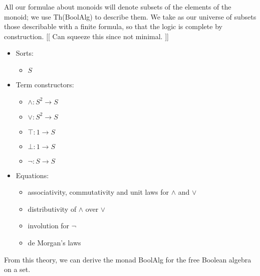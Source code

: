 \documentclass{llncs}
\newcommand{\maps}{\colon}
\begin{document}
All our formulae about monoids will denote subsets of the elements of the monoid; we use Th(BoolAlg) to describe them.  We take as our universe of subsets those describable with a finite formula, so that the logic is complete by construction. [[ Can squeeze this since not minimal. ]]
\begin{center}
  \begin{itemize}
    \item Sorts:
    \begin{itemize}
      \item $S$
    \end{itemize}
    \item Term constructors:
    \begin{itemize}
      \item $\land\maps S^2 \to S$
      \item $\lor\maps S^2 \to S$
      \item $\top\maps 1 \to S$
      \item $\bot\maps 1 \to S$
      \item $\neg\maps S \to S$
    \end{itemize}
    \item Equations:
    \begin{itemize}
      \item associativity, commutativity and unit laws for $\land$ and $\lor$
      \item distributivity of $\land$ over $\lor$
      \item involution for $\neg$
      \item de Morgan's laws
    \end{itemize}
  \end{itemize}
\end{center}
From this theory, we can derive the monad BoolAlg for the free Boolean algebra on a set.
\end{document}
